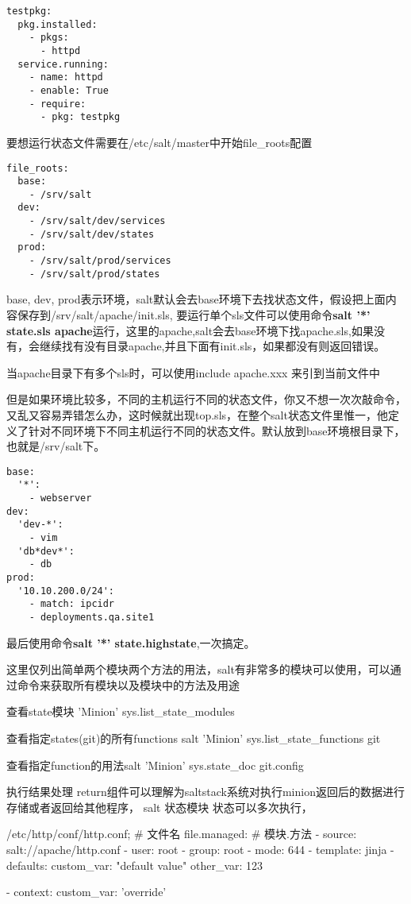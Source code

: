 {{{\begin{lstlisting}
testpkg:
  pkg.installed:
    - pkgs:
      - httpd
  service.running:
    - name: httpd
    - enable: True
    - require:
      - pkg: testpkg
\end{lstlisting}


要想运行状态文件需要在/etc/salt/master中开始file_roots配置
\begin{lstlisting}
file_roots:
  base:
    - /srv/salt
  dev:
    - /srv/salt/dev/services
    - /srv/salt/dev/states
  prod:
    - /srv/salt/prod/services
    - /srv/salt/prod/states
\end{lstlisting}

base, dev, prod表示环境，salt默认会去base环境下去找状态文件，假设把上面内容保存到/srv/salt/apache/init.sls, 要运行单个sls文件可以使用命令\textbf{salt '*' state.sls apache}运行，这里的apache,salt会去base环境下找apache.sls,如果没有，会继续找有没有目录apache,并且下面有init.sls，如果都没有则返回错误。

当apache目录下有多个sls时，可以使用include apache.xxx 来引到当前文件中

但是如果环境比较多，不同的主机运行不同的状态文件，你又不想一次次敲命令，又乱又容易弄错怎么办，这时候就出现top.sls，在整个salt状态文件里惟一，他定义了针对不同环境下不同主机运行不同的状态文件。默认放到base环境根目录下，也就是/srv/salt下。
\begin{lstlisting}
base:
  '*':
    - webserver
dev:
  'dev-*':
    - vim
  'db*dev*':
    - db
prod:
  '10.10.200.0/24':
    - match: ipcidr
    - deployments.qa.site1
\end{lstlisting}

最后使用命令\textbf{salt '*' state.highstate},一次搞定。

这里仅列出简单两个模块两个方法的用法，salt有非常多的模块可以使用，可以通过命令来获取所有模块以及模块中的方法及用途

\begin{description}
\item{查看state模块} 'Minion' sys.list_state_modules
\item{查看指定states(git)的所有functions} salt 'Minion' sys.list_state_functions git 
\item{查看指定function的用法}salt 'Minion' sys.state_doc git.config
\end{description}

执行结果处理
return组件可以理解为saltstack系统对执行minion返回后的数据进行存储或者返回给其他程序，
salt 状态模块
状态可以多次执行，


/etc/http/conf/http.conf; # 文件名
file.managed: # 模块.方法
- source: salt://apache/http.conf
- user: root
- group: root
- mode: 644
- template: jinja
- defaults:
custom_var: "default value"
other_var: 123
{%
- context:
custom_var: 'override'
{%


}}}}}
